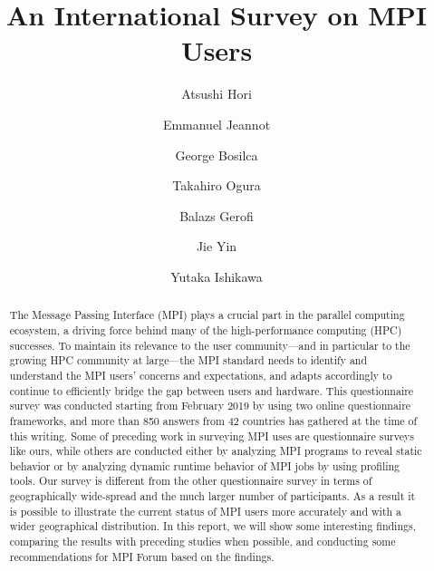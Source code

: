 \documentclass[preprint,5p,times]{elsarticle}
\begin{document}
\title{An International Survey on MPI Users}


\author[1]{Atsushi Hori}
\author[2]{Emmanuel Jeannot}
\author[3]{George Bosilca}
\author[1]{Takahiro Ogura}
\author[1]{Balazs Gerofi}
\author[1]{Jie Yin}
\author[1]{Yutaka Ishikawa}


\begin{abstract}
  The Message Passing Interface (MPI) plays a crucial part in the
  parallel computing ecosystem, a driving force behind many of the
  high-performance computing (HPC) successes. To maintain its relevance
  to the user community---and in particular to the growing HPC community
  at large---the MPI standard needs to identify and understand the MPI
  users' concerns and expectations, and adapts
  accordingly to continue to efficiently bridge the gap between users
  and hardware. This questionnaire survey was conducted starting from
  February 
  2019 by using two online questionnaire frameworks, and more than 850
  answers from 42 countries has gathered at the time of this writing.
  Some of preceding work in surveying MPI uses are questionnaire surveys
  like ours, while others are conducted either by analyzing MPI programs
  to reveal static behavior or by analyzing dynamic runtime behavior of
  MPI jobs by using profiling tools. Our survey is different from the
  other questionnaire survey in terms of geographically wide-spread and
  the much larger number of participants. As a result it is possible to
  illustrate the current status of MPI users more accurately and with a
  wider geographical distribution. In this report, we will show some
  interesting findings, comparing the results with preceding studies
  when possible, and conducting some recommendations for MPI Forum
  based on the findings.
\end{abstract}
\end{document}

